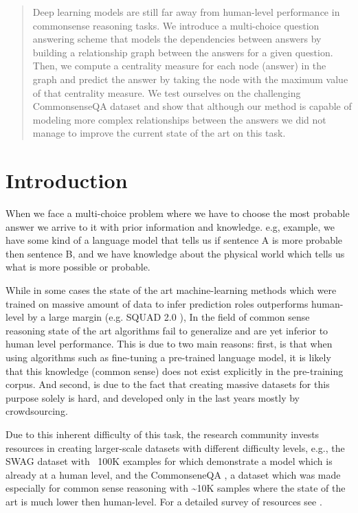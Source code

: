 \documentclass{article}
\begin{document}
\begin{abstract}
Deep learning models are still far away from human-level performance in commonsense reasoning tasks.
We introduce a multi-choice question answering scheme that models the dependencies between answers by
building a relationship graph between the answers for a given question. 
Then, we compute a centrality measure for each node (answer) in the graph and predict the answer by taking the node with the maximum value of that centrality measure.
We test ourselves on the challenging CommonsenseQA dataset and show that although our method is capable of modeling more complex relationships between the answers we did not manage to improve the current state of the art on this task.
\end{abstract}

\section{Introduction}
When we face a multi-choice problem where we have to choose the most 
probable answer we arrive to it with prior information and knowledge. e.g,  example, we have some kind of a language model that tells us if sentence A is more probable then sentence B, and we have knowledge about the physical world which tells us what is more possible or probable.


While in some cases the state of the art machine-learning methods which were trained on massive amount of data to infer prediction roles
outperforms human-level by a large margin (e.g. SQUAD 2.0 \cite{rajpurkar2018know}),
In the field of common sense reasoning  \cite{talmor2018commonsenseqa} state of the art algorithms fail to generalize and are yet inferior to human level performance.
This is due to two main reasons: first, is that when using algorithms such as fine-tuning a pre-trained language model, it is likely that this knowledge (common sense) does not exist explicitly in the pre-training corpus. And second, is due to the fact that creating massive datasets for this purpose solely is hard, and developed only in the last years mostly by crowdsourcing.

Due to this inherent difficulty of this task, the research community invests resources in creating larger-scale datasets with different difficulty levels, e.g., the SWAG \cite{zellers2018swag} dataset with ~100K examples for which \cite{devlin2018bert} demonstrate a model which is already at a human level, and the CommonseneQA \cite{talmor2018commonsenseqa}, a dataset which was made especially for common sense reasoning with \~{}10K samples where the state of the art is much lower then human-level. For a detailed survey of resources see \cite{storks2019commonsense}. 
\end{document}

